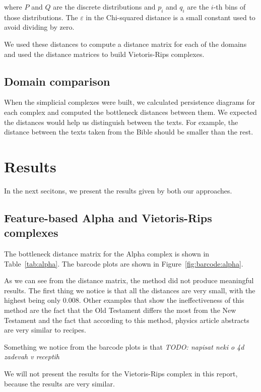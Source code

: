 \documentclass[12pt,a4paper]{amsart}
\begin{document}
\noindent
where $P$ and $Q$ are the discrete distributions and $p_i$ and $q_i$ are the
$i$-th bins of those distributions. The $\varepsilon$ in the Chi-squared
distance is a small constant used to avoid dividing by zero.

We used these distances to compute a distance matrix for each of the
domains and used the distance matrices to build Vietoris-Rips complexes.

\subsection{Domain comparison}

When the simplicial complexes were built, we calculated persistence diagrams for
each complex and computed the bottleneck distances between them. We expected the
distances would help us distinguish between the texts. For example, the distance
between the texts taken from the Bible should be smaller than the rest.

\section{Results}

In the next secitons, we present the results given by both our approaches.

\subsection{Feature-based Alpha and Vietoris-Rips complexes} The bottleneck
distance matrix for the Alpha complex is shown in Table~\ref{tab:alpha}. The
barcode plots are shown in Figure~\ref{fig:barcode:alpha}.

As we can see from the distance matrix, the method did not produce meaningful
results. The first thing we notice is that all the distances are very small,
with the highest being only 0.008. Other examples that show the ineffectiveness
of this method are the fact that the Old Testament differs the most from the New
Testament and the fact that according to this method, physics article abstracts
are very similar to recipes.

Something we notice from the barcode plots is that
\emph{TODO: napisat neki o 4d zadevah v receptih}

We will not present the results for the Vietoris-Rips complex in this report,
because the results are very similar.
\end{document}
